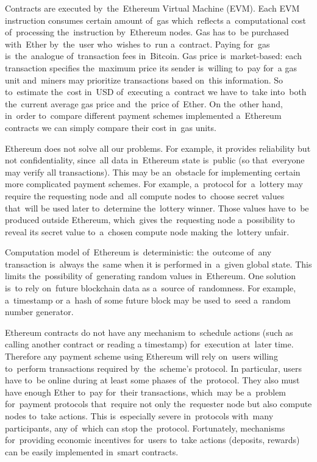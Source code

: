 \documentclass[a4paper]{article}
\begin{document}
    Contracts are executed by~the~Ethereum Virtual Machine (EVM)\cite{ETHERDEV}. Each EVM instruction consumes certain
    amount of~gas which~reflects a~computational cost of~processing the~instruction by~Ethereum nodes. Gas has to~be
    purchased with~Ether by~the~user who~wishes to~run a~contract. Paying for~gas is~the~analogue of~transaction fees
    in~Bitcoin. Gas price is~market-based: each transaction specifies the~maximum price its sender is~willing to~pay
    for~a gas unit and~miners may prioritize transactions based on~this information. So to~estimate the~cost in~USD
    of~executing a~contract we have to~take into~both the~current average gas price and~the~price of~Ether.
    On the~other hand, in~order to~compare different payment schemes implemented a~Ethereum contracts we can simply
    compare their cost in~gas units.

    Ethereum does not solve all our problems. For example, it provides reliability but not confidentiality, since~all
    data in~Ethereum state is~public (so that~everyone may verify all transactions). This may be an~obstacle for
    implementing certain more complicated payment schemes. For example, a~protocol for~a~lottery may require the
    requesting node and~all compute nodes to~choose secret values that~will be used later to~determine the~lottery
    winner. Those values have to~be produced outside Ethereum, which~gives the~requesting node a~possibility to
    reveal its secret value to~a~chosen compute node making the~lottery unfair.

    Computation model of~Ethereum is~deterministic: the~outcome of~any transaction is~always the~same when it is
    performed in~a~given global state. This limits the~possibility of~generating random values in~Ethereum.
    One solution is~to rely on~future blockchain data as a~source of~randomness. For example, a~timestamp or a~hash of
    some future block may be used to~seed a~random number generator.

    Ethereum contracts do not have any mechanism to~schedule actions (such as calling another contract or reading a
    timestamp) for~execution at~later time. Therefore any payment scheme using Ethereum will rely on~users willing
    to~perform transactions required by~the~scheme's protocol. In particular, users have to~be online during at
    least some phases of~the~protocol. They also must have enough Ether to~pay for~their transactions, which~may be
    a~problem for~payment protocols that~require not only the~requester node but also compute nodes to~take actions.
    This is~especially severe in~protocols with~many participants, any of~which can stop the~protocol.
    Fortunately, mechanisms for~providing economic incentives for~users to~take actions (deposits, rewards)
    can be easily implemented in~smart contracts.
\end{document}
